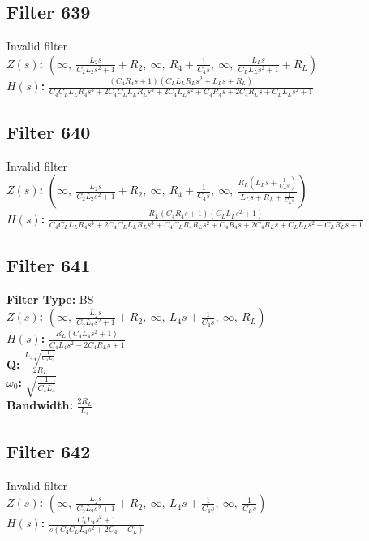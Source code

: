 \documentclass{article}
\begin{document}
\subsection*{Filter 639}
Invalid filter \\ 
\textbf{$Z(s)$:} $\left( \infty, \  \frac{L_{2} s}{C_{2} L_{2} s^{2} + 1} + R_{2}, \  \infty, \  R_{4} + \frac{1}{C_{4} s}, \  \infty, \  \frac{L_{L} s}{C_{L} L_{L} s^{2} + 1} + R_{L}\right)$ \\ 
\textbf{$H(s)$:} $\frac{\left(C_{4} R_{4} s + 1\right) \left(C_{L} L_{L} R_{L} s^{2} + L_{L} s + R_{L}\right)}{C_{4} C_{L} L_{L} R_{4} s^{3} + 2 C_{4} C_{L} L_{L} R_{L} s^{3} + 2 C_{4} L_{L} s^{2} + C_{4} R_{4} s + 2 C_{4} R_{L} s + C_{L} L_{L} s^{2} + 1}$ \\ 
\subsection*{Filter 640}
Invalid filter \\ 
\textbf{$Z(s)$:} $\left( \infty, \  \frac{L_{2} s}{C_{2} L_{2} s^{2} + 1} + R_{2}, \  \infty, \  R_{4} + \frac{1}{C_{4} s}, \  \infty, \  \frac{R_{L} \left(L_{L} s + \frac{1}{C_{L} s}\right)}{L_{L} s + R_{L} + \frac{1}{C_{L} s}}\right)$ \\ 
\textbf{$H(s)$:} $\frac{R_{L} \left(C_{4} R_{4} s + 1\right) \left(C_{L} L_{L} s^{2} + 1\right)}{C_{4} C_{L} L_{L} R_{4} s^{3} + 2 C_{4} C_{L} L_{L} R_{L} s^{3} + C_{4} C_{L} R_{4} R_{L} s^{2} + C_{4} R_{4} s + 2 C_{4} R_{L} s + C_{L} L_{L} s^{2} + C_{L} R_{L} s + 1}$ \\ 
\subsection*{Filter 641}
\textbf{Filter Type:} BS \\ 
\textbf{$Z(s)$:} $\left( \infty, \  \frac{L_{2} s}{C_{2} L_{2} s^{2} + 1} + R_{2}, \  \infty, \  L_{4} s + \frac{1}{C_{4} s}, \  \infty, \  R_{L}\right)$ \\ 
\textbf{$H(s)$:} $\frac{R_{L} \left(C_{4} L_{4} s^{2} + 1\right)}{C_{4} L_{4} s^{2} + 2 C_{4} R_{L} s + 1}$ \\ 
\textbf{Q:} $\frac{L_{4} \sqrt{\frac{1}{C_{4} L_{4}}}}{2 R_{L}}$ \\ 
\textbf{$\omega_0$:} $\sqrt{\frac{1}{C_{4} L_{4}}}$ \\ 
\textbf{Bandwidth:} $\frac{2 R_{L}}{L_{4}}$ \\ 
\subsection*{Filter 642}
Invalid filter \\ 
\textbf{$Z(s)$:} $\left( \infty, \  \frac{L_{2} s}{C_{2} L_{2} s^{2} + 1} + R_{2}, \  \infty, \  L_{4} s + \frac{1}{C_{4} s}, \  \infty, \  \frac{1}{C_{L} s}\right)$ \\ 
\textbf{$H(s)$:} $\frac{C_{4} L_{4} s^{2} + 1}{s \left(C_{4} C_{L} L_{4} s^{2} + 2 C_{4} + C_{L}\right)}$ \\ 
\end{document}
